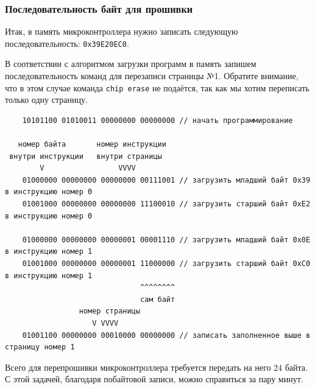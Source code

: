 \documentclass[aspectratio=169, pdf, 8pt, unicode]{beamer}
\begin{document}
\begin{frame}[fragile]
\frametitle{Последовательность байт для прошивки}
	Итак, в память микроконтроллера нужно записать следующую последовательность: \texttt{0x39E20EC0}.

	В соответствии с алгоритмом загрузки программ в память запишем последовательность команд для перезаписи страницы №1.
	Обратите внимание, что в этом случае команда \texttt{chip erase} не подаётся, так как мы хотим переписать только одну страницу.
	\begin{verbatim}
    10101100 01010011 00000000 00000000 // начать программирование

   номер байта       номер инструкции
 внутри инструкции   внутри страницы
        V                 VVVV
    01000000 00000000 00000000 00111001 // загрузить младший байт 0x39 в инструкцию номер 0
    01001000 00000000 00000000 11100010 // загрузить старший байт 0xE2 в инструкцию номер 0

    01000000 00000000 00000001 00001110 // загрузить младший байт 0x0E в инструкцию номер 1
    01001000 00000000 00000001 11000000 // загрузить старший байт 0xC0 в инструкцию номер 1
                               ^^^^^^^^
                               сам байт
                 номер страницы
                    V VVVV
    01001100 00000000 00010000 00000000 // записать заполненное выше в страницу номер 1
	\end{verbatim}
	Всего для перепрошивки микроконтроллера требуется передать на него 24 байта. С этой задачей, благодаря побайтовой записи,
	можно справиться за пару минут.
\end{frame}
\end{document}
